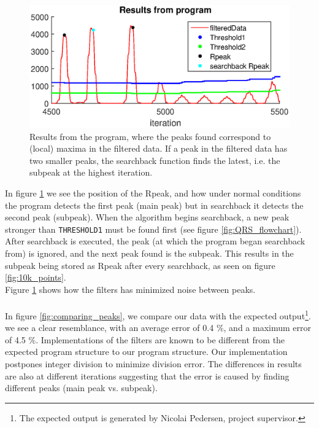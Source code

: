\begin{figure}[H]
    \centering
    \includegraphics[width=1.0\textwidth]{3Results/fig/1kpointsmatlab.eps}
    \caption{Results from the program, where the peaks found correspond to (local) maxima in the filtered data. If a peak in the filtered data has two smaller peaks, the searchback function finds the latest, i.e. the subpeak at the highest iteration.}
    \label{fig:1kpoints}
\end{figure}

In figure \ref{fig:1kpoints} we see the position of the Rpeak, and how under normal conditions the program detects the first peak (main peak) but in searchback it detects the second peak (subpeak). When the algorithm begins searchback, a new peak stronger than \texttt{THRESHOLD1} must be found first (see figure \ref{fig:QRS_flowchart}). After searchback is executed, the peak (at which the program began searchback from) is ignored, and the next peak found is the subpeak. This results in the subpeak being stored as Rpeak after every searchback, as seen on figure \ref{fig:10k_points}.\\ Figure \ref{fig:1kpoints} shows how the filters has minimized noise between peaks.\\
\\
In figure \ref{fig:comparing_peaks}, we compare our data with the expected output\footnote{The expected output is generated by Nicolai Pedersen, project supervisor.}. we see a clear resemblance, with an average error of 0.4 $\%$, and a maximum error of 4.5 $\%$. Implementations of the filters are known to be different from the expected program structure to our program structure. Our implementation postpones integer division to minimize division error. The differences in results are also at different iterations suggesting that the error is caused by finding different peaks (main peak vs. subpeak).

